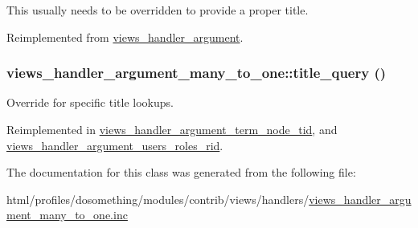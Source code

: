 This usually needs to be overridden to provide a proper title. 

Reimplemented from \hyperlink{classviews__handler__argument_a76181ac24e7be4a09aaafc1fa5f15ea1}{views\_\-handler\_\-argument}.\hypertarget{classviews__handler__argument__many__to__one_a0b758f84ee6b9a473313ec92714b06c7}{
\subsubsection[{title\_\-query}]{\setlength{\rightskip}{0pt plus 5cm}views\_\-handler\_\-argument\_\-many\_\-to\_\-one::title\_\-query ()}}
\label{classviews__handler__argument__many__to__one_a0b758f84ee6b9a473313ec92714b06c7}
Override for specific title lookups. 

Reimplemented in \hyperlink{classviews__handler__argument__term__node__tid_a9f858ee5c343f6a14b87a320316710f0}{views\_\-handler\_\-argument\_\-term\_\-node\_\-tid}, and \hyperlink{classviews__handler__argument__users__roles__rid_a0cc229ef972f8a7d9184b45443271992}{views\_\-handler\_\-argument\_\-users\_\-roles\_\-rid}.

The documentation for this class was generated from the following file:\begin{DoxyCompactItemize}
\item 
html/profiles/dosomething/modules/contrib/views/handlers/\hyperlink{views__handler__argument__many__to__one_8inc}{views\_\-handler\_\-argument\_\-many\_\-to\_\-one.inc}\end{DoxyCompactItemize}
